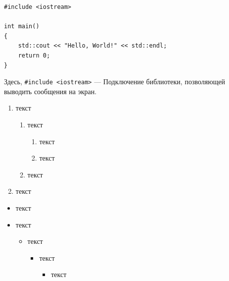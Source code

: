 \documentclass[120.214pt]{article}%
\begin{document}


\begin{verbatim}
#include <iostream>

int main()
{
	std::cout << "Hello, World!" << std::endl;
	return 0;
}
\end{verbatim}

Здесь, \verb|#include <iostream>| --- Подключение библиотеки, позволяющей выводить сообщения на экран.

\newpage

\begin{enumerate} 
	\item текст
	\begin{enumerate} 
		\item текст
		\begin{enumerate} 
			\item текст
			\item текст
		\end{enumerate}
		\item текст
	\end{enumerate} 
	\item текст
\end{enumerate}
\begin{itemize}
	\item текст
	\item текст
	\begin{itemize}
		\item текст
		\begin{itemize}
			\item текст
			\begin{itemize}
				\item текст
			\end{itemize}
		\end{itemize}
	\end{itemize}
\end{itemize}
\end{document}
